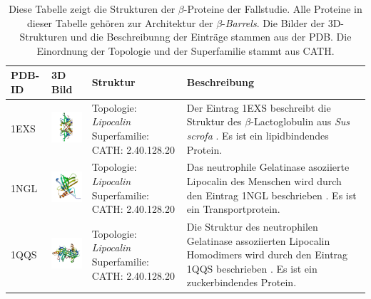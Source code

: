 \documentclass{article}
\begin{document}
\begin{table}
\begin{center}
\caption{Diese Tabelle zeigt die Strukturen der $\beta$-Proteine der Fallstudie. Alle Proteine in dieser Tabelle geh\"oren zur Architektur der $\beta$-\textit{Barrels}. Die Bilder der 3D-Strukturen und die Beschreibunng der Eintr\"age stammen aus der PDB. Die Einordnung der Topologie und der Superfamilie stammt aus CATH. }
\begin{tabular}{ | C{9mm} | C{30mm} | C{29mm} | C{38mm} | }
\hline
PDB-ID & 3D Bild & Struktur & Beschreibung \\ \hline
1EXS  & \includegraphics[width=30mm, trim= -10 -5 -5 -10]{1EXS_bio_r_500.jpg} & Topologie: \newline \textit{Lipocalin} \newline Superfamilie: CATH: 2.40.128.20 & Der Eintrag 1EXS beschreibt die Struktur des $\beta$-Lactoglobulin aus \textit{Sus scrofa} \cite{1exs}. Es ist ein lipidbindendes Protein. \\ \hline
1NGL  & \includegraphics[width=30mm, trim= -10 -5 -5 -10]{1NGL_asym_r_500.jpg} & Topologie: \newline \textit{Lipocalin} \newline Superfamilie: CATH: 2.40.128.20  & Das neutrophile Gelatinase asoziierte Lipocalin des Menschen wird durch den Eintrag 1NGL beschrieben \cite{1ngl}. Es ist ein Transportprotein. \\ \hline
1QQS  & \includegraphics[width=30mm, trim= -10 -5 -5 -10]{1QQS_bio_r_500.jpg} & Topologie: \newline \textit{Lipocalin} \newline Superfamilie: CATH: 2.40.128.20  & Die Struktur des neutrophilen Gelatinase assoziierten Lipocalin Homodimers wird durch den Eintrag 1QQS beschrieben \cite{1qqs}. Es ist ein zuckerbindendes Protein.  \\ \hline

\end{tabular}
\end{center}
\end{table}
\end{document}

